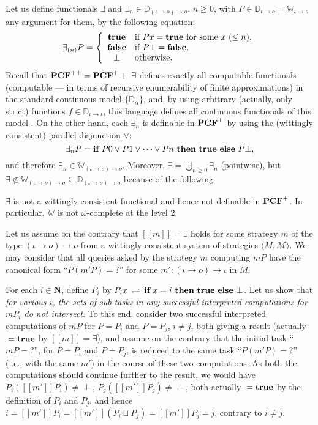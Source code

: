 \documentclass[fleqn]{LMCS}
\theoremstyle{plain}\newtheorem{satz}[thm]{Satz}
\theoremstyle{plain}\newtheorem{hyp}[thm]{Hypothesis}
\theoremstyle{plain}\newtheorem{hyps}[thm]{Hypotheses}
\theoremstyle{definition}\newtheorem{note}[thm]{Note}
\newcommand{\setof}[1]{\{#1\}}
\newcommand{\bYdef}{\mathrel{\BYDEF}}
\newcommand{\BYDEF}{\mbox{$\hspace{.2em}\rightleftharpoons\hspace{.2em}$}}
\newcommand{\pointwiselub}{\biguplus}
\newcommand{\arr}{\rightarrow}
\newcommand{\la}{\langle}
\newcommand{\ra}{\rangle}
\newcommand{\Dsem}[1]{[\![ #1 ]\!]}
\newcommand{\tuple}[1]{\la #1 \ra}
\newcommand{\NN}{\mathbf{N}}
\newcommand{\tbbW}{\mathbb{W}}\newcommand{\bbD}{\mathbb{D}}
\newcommand{\PCF}{\mbox{\bf PCF}}
\newcommand{\IF}{\mbox{\bf if}}
\newcommand{\THEN}{\mbox{\bf then}}
\newcommand{\ELSE}{\mbox{\bf else}}
\newcommand{\Undef}{{\perp}}
\newcommand{\MM}{{\mathcal M}}
\newcommand{\?}{\mbox{?}}
\newcommand{\false}{\mbox{\bf false}}
\newcommand{\true}{\mbox{\bf true}}
\begin{document}
Let us define functionals $\exists$ and $\exists_n\in \bbD_{(\iota\arr o)\arr o}$, 
$n\ge0$, with $P\in \bbD_{\iota\arr o}=\tbbW_{\iota\arr o}$ any argument for them, 
by the following equation: 
\[
\exists_{(n)} P = 
\left\{
\begin{array}{cl}
\true & \mbox{if }Px=\true\mbox{ for some }x\ (\le n),\\
\false & \mbox{if }P\Undef=\false, \\
\Undef & \mbox{otherwise}.
\end{array}
\right.
\]
Recall that $\PCF^{++}=\PCF^+ + {\;\exists}$ defines exactly all computable 
functionals (computable --- in terms of recursive enumerability of finite approximations) 
in the standard continuous model $\setof{\bbD_{\alpha}}$, and, 
by using arbitrary (actually, only strict) 
functions 
$f\in \bbD_{\iota\arr\iota}$, 
this language defines all continuous functionals of this model 
\cite{Plotkin77,Saz76d,Saz76AL}. 
On the other hand, each $\exists_n$ is definable in $\PCF^+$ by using 
the (wittingly consistent) parallel disjunction $\vee$: 
\[
\exists_n P = \IF\ P0\vee P1\vee\cdots\vee Pn\ \THEN\ \true\ 
\ELSE\ P\Undef, 
\]
and therefore $\exists_n\in\tbbW_{(\iota\arr o)\arr o}$. 
Moreover, $\exists=\pointwiselub_{n\ge0}\exists_n$ (pointwise), but 
$\exists\not\in\tbbW_{(\iota\arr o)\arr o}\subseteq\bbD_{(\iota\arr o)\arr o}$ because of the following
\begin{prop}
$\exists$ 
is not a wittingly consistent functional 
and hence not definable in $\PCF^+$. 
In particular, $\tbbW$ is not $\omega$-complete at the level 2. 
\end{prop}
\proof  
Let us assume on the contrary that $\Dsem{m}=\exists$ holds 
for some strategy $m$ of the type 
\mbox{$(\iota\arr o)\arr o$} from a wittingly consistent system of strategies 
$\tuple{M,\MM}$. We may consider that 
all queries asked by the strategy $m$ computing $mP$ have the canonical form 
``$P(m' P)=\?$'' for some $m':(\iota\arr o)\arr \iota$ in $M$. 

For each $i\in \NN$, define 
$P_i$ by $P_i x\bYdef\IF\ x=i\ \THEN\ \true\ \ELSE\ \Undef$. 
Let us show that \emph{for various $i$, the sets of sub-tasks in any successful 
interpreted computations for $mP_i$ do not intersect}.
To this end, consider two successful interpreted computations of $mP$ 
for $P=P_i$ and $P=P_j$, $i\ne j$, both giving a result (actually ${}=\true$ 
by $\Dsem{m}=\exists$), and 
assume on the contrary that the initial task ``$mP=\?$'', 
for $P=P_i$ and $P=P_j$, is reduced to the same task ``$P(m'P)=\?$'' 
(i.e., with the same $m'$) 
in the course of these two computations. 
As both the computations should continue further to the result, 
we would have 
$P_i(\Dsem{m'}P_i)\ne\Undef$, $P_j(\Dsem{m'}P_j)\ne\Undef$, 
both actually ${}=\true$ by the definition of $P_i$ and $P_j$,  
and hence 
$i=\Dsem{m'}P_i=\Dsem{m'}(P_i\sqcup P_j)=\Dsem{m'}P_j=j$, 
contrary to $i\ne j$. 
\end{document}
